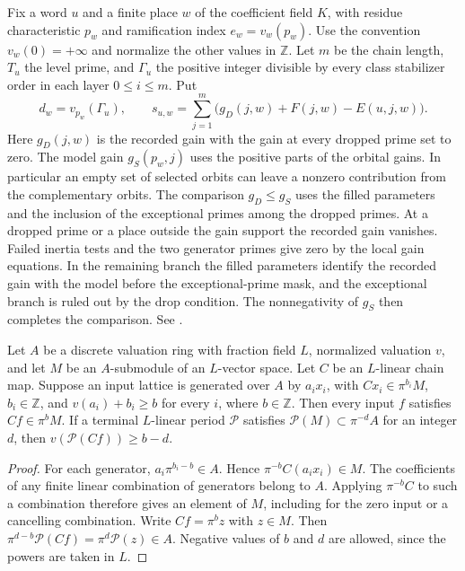 Fix a word \(u\) and a finite place \(w\) of the coefficient field \(K\), with residue characteristic \(p_w\) and ramification index \(e_w=v_w(p_w)\). Use the convention \(v_w(0)=+\infty\) and normalize the other values in \(\mathbb Z\). Let \(m\) be the chain length, \(T_u\) the level prime, and \(\Gamma_u\) the positive integer  divisible by every class stabilizer order in each layer \(0\le i\le m\).  Put
\begin{equation}\label{geo:budget}
 d_w=v_{p_w}(\Gamma_u),\qquad
 s_{u,w}=\sum_{j=1}^{m}\bigl(g_D(j,w)+F(j,w)-E(u,j,w)\bigr).
\end{equation}
Here \(g_D(j,w)\) is the recorded gain with the gain at every dropped prime set to zero. The model gain \(g_S(p_w,j)\) uses the positive parts of the orbital gains. In particular an empty set of selected orbits can leave a nonzero contribution from the complementary orbits. The comparison \(g_D\le g_S\) uses the filled parameters and the inclusion of the exceptional  primes among the dropped primes. At a dropped prime or a place outside the gain support the recorded gain vanishes. Failed inertia tests and the two generator primes give zero by the local gain equations. In the remaining branch the filled parameters identify the recorded gain with the model before the exceptional-prime mask, and the exceptional branch is ruled out by the drop condition. The nonnegativity of \(g_S\) then completes the comparison. See .

\begin{lemma}\label{geo:generators}
Let \(A\) be a discrete valuation ring with fraction field \(L\), normalized valuation \(v\), and let \(M\) be an \(A\)-submodule of an \(L\)-vector space. Let \(C\) be an \(L\)-linear chain map. Suppose an input lattice is generated over \(A\) by \(a_i x_i\), with \(C x_i\in \pi^{b_i} M\), \(b_i\in\mathbb Z\), and \(v(a_i)+b_i\ge b\) for every \(i\), where \(b\in\mathbb Z\). Then every input \(f\) satisfies \(C f\in\pi^b M\). If a terminal \(L\)-linear period \(\mathcal P\) satisfies \(\mathcal P(M)\subset\pi^{-d}A\) for an integer \(d\), then \(v(\mathcal P(Cf))\ge b-d\).
\end{lemma}
\begin{proof}
For each generator, \(a_i\pi^{b_i-b}\in A\). Hence \(\pi^{-b}C(a_i x_i)\in M\). The coefficients of any finite linear combination of generators belong to \(A\). Applying \(\pi^{-b}C\) to such a combination therefore gives an element of \(M\), including for the zero input or a cancelling combination. Write \(C f=\pi^b z\) with \(z\in M\). Then \(\pi^{d-b}\mathcal P(C f)=\pi^d\mathcal P(z)\in A\). Negative values of \(b\) and \(d\) are allowed, since the powers are taken in \(L\).
\end{proof}

